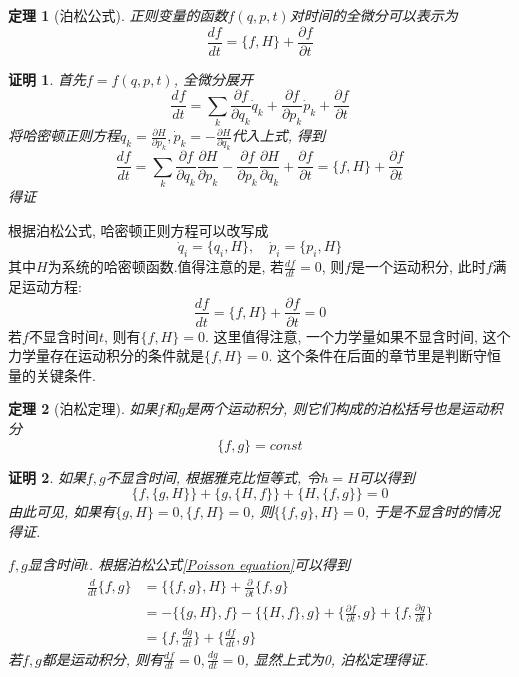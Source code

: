 \documentclass[a4paper,11pt]{article}
\theoremstyle{mystyle}
\newtheorem{theorem}{\hspace{2em}定理}[section]
\newtheorem{Proof}{\hspace{2em}证明}[section]
\begin{document}
\begin{theorem}[泊松公式]
正则变量的函数$f(q,p,t)$对时间的全微分可以表示为
  \begin{equation}\label{Poisson equation}
  \frac{df}{dt}=\{f,H\}+\frac{\partial f}{\partial t}
  \end{equation}
\end{theorem}
\begin{Proof}
  首先$f=f(q,p,t)$, 全微分展开
\begin{equation*}
  \frac{df}{dt}=\sum_{k}\frac{\partial f}{\partial{q_k}}\dot{q}_k+\frac{\partial f}{\partial{p_k}}\dot{p}_k+\frac{\partial f}{\partial t}
\end{equation*}
将哈密顿正则方程$\dot{q}_k=\frac{\partial H}{\partial{p_k}},\dot{p}_k=-\frac{\partial H}{\partial{q_k}}$代入上式, 得到
\begin{equation*}
  \frac{df}{dt}=\sum_{k}\frac{\partial f}{\partial{q_k}}\frac{\partial H}{\partial{p_k}}-\frac{\partial f}{\partial{p_k}}\frac{\partial H}{\partial{q_k}}+\frac{\partial f}{\partial t}=\{f,H\}+\frac{\partial f}{\partial t}
\end{equation*}
得证
\end{Proof}
根据泊松公式, 哈密顿正则方程可以改写成
\begin{equation*}
  \dot{q}_i=\{q_i,H\},\quad \dot{p}_i=\{p_i,H\}
\end{equation*}
其中$H$为系统的哈密顿函数.值得注意的是, 若$\frac{df}{dt}=0$, 则$f$是一个运动积分, 此时$f$满足运动方程:
\begin{equation*}
  \frac{df}{dt}=\{f,H\}+\frac{\partial f}{\partial t}=0
\end{equation*}
若$f$不显含时间$t$, 则有$\{f,H\}=0$. 这里值得注意, 一个力学量如果不显含时间, 这个力学量存在运动积分的条件就是$\{f,H\}=0$. 这个条件在后面的章节里是判断守恒量的关键条件.
\begin{theorem}[泊松定理]
  如果$f$和$g$是两个运动积分, 则它们构成的泊松括号也是运动积分
  \begin{equation*}
    \{f,g\}=const
  \end{equation*}
\end{theorem}
\begin{Proof}
  如果$f,g$不显含时间, 根据雅克比恒等式, 令$h=H$可以得到
\begin{equation*}
  \{f,\{g,H\}\}+\{g,\{H,f\}\}+\{H,\{f,g\}\}=0
\end{equation*}
由此可见, 如果有$\{g,H\}=0,\{f,H\}=0$, 则$\{\{f,g\},H\}=0$, 于是不显含时的情况得证.

$f,g$显含时间$t$. 根据泊松公式\eqref{Poisson equation}可以得到
\begin{equation*}
\begin{split}
   \frac{d}{dt}\{f,g\}&=\{\{f,g\},H\}+\frac{\partial}{\partial t}\{f,g\} \\
     &=-\{\{g,H\},f\}-\{\{H,f\},g\}+\{\frac{\partial f}{\partial t},g\}+\{f,\frac{\partial g}{\partial t}\} \\
     &=\{f,\frac{dg}{dt}\}+\{\frac{df}{dt},g\}
\end{split}
\end{equation*}
若$f,g$都是运动积分, 则有$\frac{df}{dt}=0,\frac{dg}{dt}=0$, 显然上式为0, 泊松定理得证.
\end{Proof}
\end{document}
